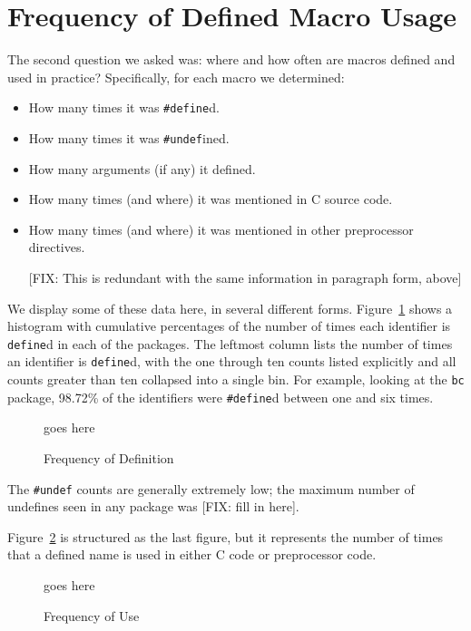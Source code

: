 \section{Frequency of Defined Macro Usage}\label{sec:usage}

The second question we asked was: where and how often are macros
defined and used in practice?  Specifically, for each macro we
determined:
\begin{itemize}

\item How many times it was \verb+#define+d.
\item How many times it was \verb+#undef+ined.
\item How many arguments (if any) it defined.
\item How many times (and where) it was mentioned in C source code.
\item How many times (and where) it was mentioned in other
preprocessor directives.

[FIX: This is redundant with the same information in paragraph form, above]

\end{itemize}

We display some of these data here, in several different forms.
Figure~\ref{fig:define_count} shows a histogram with cumulative
percentages of the number of times each identifier is \verb+define+d
in each of the packages.  The leftmost column lists the number of
times an identifier is \verb+define+d, with the one through ten counts
listed explicitly and all counts greater than ten collapsed into a
single bin.  For example, looking at the \verb+bc+ package, 98.72\% of
the identifiers were \verb+#define+d between one and six times.

\begin{figure}
goes here

\caption{Frequency of Definition\label{fig:define_count}}
\end{figure}

The \verb+#undef+ counts are generally extremely low; the maximum
number of undefines seen in any package was [FIX: fill in here].

Figure~\ref{fig:use_count} is structured as the last figure, but it
represents the number of times that a defined name is used in either C
code or preprocessor code.

\begin{figure}
goes here

\caption{Frequency of Use\label{fig:use_count}}
\end{figure}

